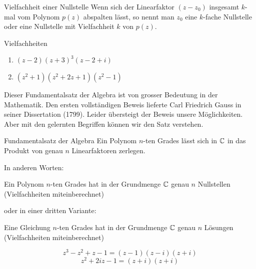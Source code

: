 \begin{definition}
    {Vielfachheit einer Nullstelle}{}
    Wenn sich der Linearfaktor $(z-z_0 )$ insgesamt $k$-mal vom Polynom $p(z)$ abspalten lässt, so nennt man $z_0$ eine $k$-fache Nullstelle oder eine Nullstelle mit Vielfachheit $k$ von $p(z)$.
\end{definition}
\begin{bsp}
    {Vielfachheiten}{}
    \begin{enumerate}
        \item $	(z-2) (z+3)^3 (z-2+i)$
         \vspace{2cm}
        \item $(z^2+1)(z^2+2z+1)(z^2-1)$
        \vspace{5cm}

    \end{enumerate}
\end{bsp}


Dieser Fundamentalsatz der Algebra ist von grosser Bedeutung in der Mathematik. Den ersten vollständigen Beweis lieferte Carl Friedrich Gauss in seiner Dissertation (1799). Leider übersteigt der Beweis unsere Möglichkeiten. Aber mit den gelernten Begriffen können wir den Satz verstehen. 

\begin{satz}
    {Fundamentalsatz der Algebra}{}
    Ein Polynom $n$-ten Grades lässt sich in $\mathbb{C}$ in das Produkt von genau $n$ Linearfaktoren zerlegen.

    \bigskip

    In anderen Worten:

    \bigskip


    Ein Polynom $n$-ten Grades hat in der Grundmenge $\mathbb{C}$ genau $n$ Nullstellen (Vielfachheiten miteinberechnet) 

    \bigskip


    oder in einer dritten Variante:

    \bigskip

    Eine Gleichung $n$-ten Grades hat in der Grundmenge $\mathbb{C}$ genau $n$ Lösungen (Vielfachheiten miteinberechnet)

\end{satz}


\begin{bsp}
    {}{}

    
$$z^3-z^2+z-1=(z-1)(z-i)(z+i) $$
$$z^2+2iz-1=(z+i)(z+i) $$

\end{bsp}

